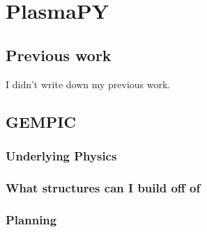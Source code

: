 \chapter{PlasmaPY}

\section{Previous work}

I didn't write down my previous work.

\section{GEMPIC}

\subsection{Underlying Physics}


\subsection{What structures can I build off of}


\subsection{Planning}
